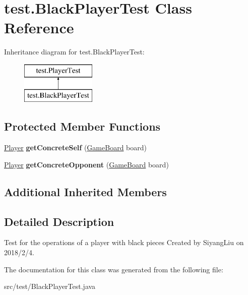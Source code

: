 \hypertarget{classtest_1_1_black_player_test}{}\section{test.\+Black\+Player\+Test Class Reference}
\label{classtest_1_1_black_player_test}
Inheritance diagram for test.\+Black\+Player\+Test\+:\begin{figure}[H]
\begin{center}
\leavevmode
\includegraphics[height=2.000000cm]{classtest_1_1_black_player_test}
\end{center}
\end{figure}
\subsection*{Protected Member Functions}
\begin{DoxyCompactItemize}
\item 
\mbox{\label{classtest_1_1_black_player_test_aa6c6c27aa8860f23b86b9a3ddaa44f74}} 
\mbox{\hyperlink{classplayers_1_1_player}{Player}} {\bfseries get\+Concrete\+Self} (\mbox{\hyperlink{classgameboard_1_1_game_board}{Game\+Board}} board)
\item 
\mbox{\label{classtest_1_1_black_player_test_a9f98a8e8bc0d6acb4957c96aaae0e018}} 
\mbox{\hyperlink{classplayers_1_1_player}{Player}} {\bfseries get\+Concrete\+Opponent} (\mbox{\hyperlink{classgameboard_1_1_game_board}{Game\+Board}} board)
\end{DoxyCompactItemize}
\subsection*{Additional Inherited Members}


\subsection{Detailed Description}
Test for the operations of a player with black pieces Created by Siyang\+Liu on 2018/2/4. 

The documentation for this class was generated from the following file\+:\begin{DoxyCompactItemize}
\item 
src/test/Black\+Player\+Test.\+java\end{DoxyCompactItemize}
